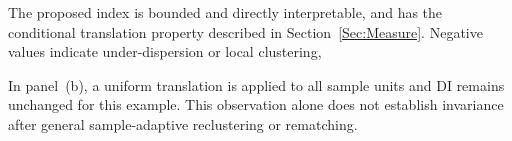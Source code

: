 The proposed index is bounded and directly interpretable, and has the conditional translation property described in Section~\ref{Sec:Measure}. Negative values indicate under-dispersion or local clustering,

In panel~(b), a uniform translation is applied to all sample units and DI
remains unchanged for this example. This observation alone does not establish invariance after general sample-adaptive reclustering or rematching.

